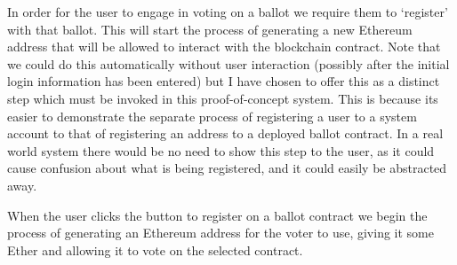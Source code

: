 \documentclass{article}
\begin{document}
In order for the user to engage in voting on a ballot we require them to `register' with that ballot. This will start the process of generating a new Ethereum address that will be allowed to interact with the blockchain contract. Note that we could do this automatically without user interaction (possibly after the initial login information has been entered) but I have chosen to offer this as a distinct step which must be invoked in this proof-of-concept system. This is because its easier to demonstrate the separate process of registering a user to a system account to that of registering an address to a deployed ballot contract. In a real world system there would be no need to show this step to the user, as it could cause confusion about what is being registered, and it could easily be abstracted away.

When the user clicks the button to register on a ballot contract we begin the process of generating an Ethereum address for the voter to use, giving it some Ether and allowing it to vote on the selected contract.
\end{document}

